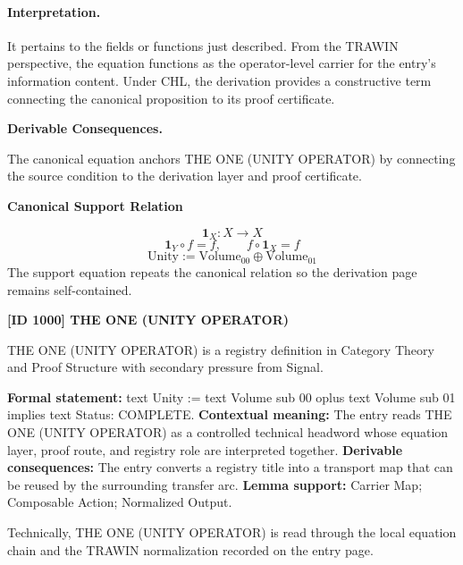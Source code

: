 \paragraph{Interpretation.}
It pertains to the fields or functions just described. From the TRAWIN perspective, the equation functions as the operator-level carrier for the entry’s information content. Under CHL, the derivation provides a constructive term connecting the canonical proposition to its proof certificate.

\par\vspace{0.35em}
\noindent\textbf{Derivable Consequences.}\quad
\begingroup
\footnotesize
\raggedright
The canonical equation anchors THE ONE (UNITY OPERATOR) by connecting the source condition to the derivation layer and proof certificate.
\par\endgroup

\noindent\textbf{Canonical Support Relation}\par
\[
\mathbf{1}_{X}:X\to X
\]
\[
\mathbf{1}_{Y}\circ f=f,\qquad f\circ\mathbf{1}_{X}=f
\]
\[
\mathrm{Unity}:=\mathrm{Volume}_{00}\oplus\mathrm{Volume}_{01}
\]
\noindent The support equation repeats the canonical relation so the derivation page remains self-contained.\par

\clearpage
\noindent\textbf{[ID 1000] THE ONE (UNITY OPERATOR)}\par
\vspace{0.35em}
\begingroup\small
{}
THE ONE (UNITY OPERATOR) is a registry definition in Category Theory and Proof Structure with secondary pressure from Signal.

\begingroup\footnotesize\setlength{\emergencystretch}{3em}\sloppy
\textbf{Formal statement:} text Unity := text Volume sub 00 oplus text Volume sub 01 implies text Status: COMPLETE. \textbf{Contextual meaning:} The entry reads THE ONE (UNITY OPERATOR) as a controlled technical headword whose equation layer, proof route, and registry role are interpreted together. \textbf{Derivable consequences:} The entry converts a registry title into a transport map that can be reused by the surrounding transfer arc. \textbf{Lemma support:} Carrier Map; Composable Action; Normalized Output.\par
\endgroup

Technically, THE ONE (UNITY OPERATOR) is read through the local equation chain and the TRAWIN normalization recorded on the entry page.


